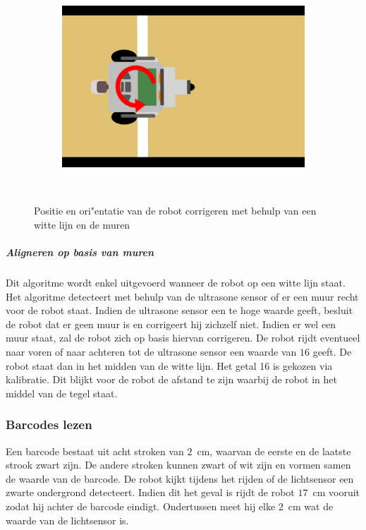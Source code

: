 \documentclass[tt3]{penoverslag}
\begin{document}
\begin{figure}
\begin{subfigure}[h]{0.24\textwidth}
		\caption{}
		\label{fig:AlgoWit6}
	\end{subfigure}
	\begin{subfigure}[h]{0.24\textwidth}
		\includegraphics[width=\textwidth]{WitteLijn7}
		\caption{}
		\label{fig:AlgoWit7}
	\end{subfigure}\\
	\caption{Positie en ori"entatie van de robot corrigeren met behulp van een witte lijn en de muren}
	\label{fig:AlgoWit}
\end{figure}

\subparagraph{Aligneren op basis van muren}
Dit algoritme wordt enkel uitgevoerd wanneer de robot op een witte lijn staat. Het algoritme detecteert met behulp van de ultrasone sensor of er een muur recht voor de robot staat. Indien de ultrasone sensor een te hoge waarde geeft, besluit de robot dat er geen muur is en corrigeert hij zichzelf niet. Indien er wel een muur staat, zal de robot zich op basis hiervan corrigeren. De robot rijdt eventueel naar voren of naar achteren tot de ultrasone sensor een waarde van $16$ geeft. De robot staat dan in het midden van de witte lijn. Het getal 16 is gekozen via kalibratie. Dit blijkt voor de robot de afstand te zijn waarbij de robot in het middel van de tegel staat. 

\subsubsection{Barcodes lezen}
\label{ssec:AlgoBar}
Een barcode bestaat uit acht stroken van $2$~cm, waarvan de eerste en de laatste strook zwart zijn. De andere stroken kunnen zwart of wit zijn en vormen samen de waarde van de barcode. De robot kijkt tijdens het rijden of de lichtsensor een zwarte ondergrond detecteert. Indien dit het geval is rijdt de robot $17$~cm vooruit zodat hij achter de barcode eindigt. Ondertussen meet hij elke $2$~cm wat de waarde van de lichtsensor is.\\
\end{document}
